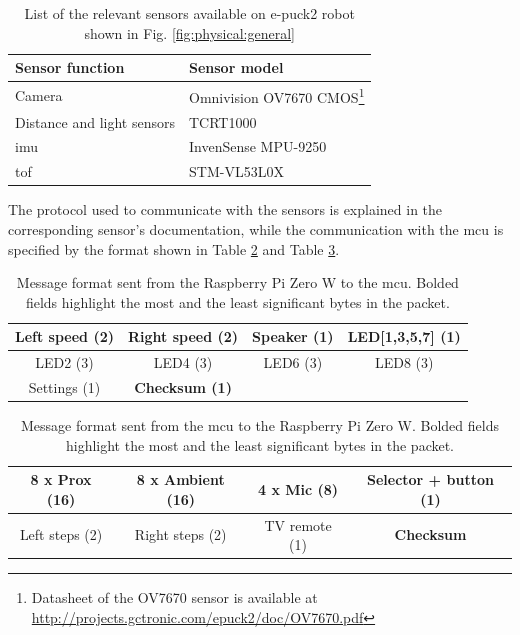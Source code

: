 \begin{table}[H]
    \centering
    \begin{tabular}{|l|l|}
        \hline
        \textbf{Sensor function} & \textbf{Sensor model} \\
        \hline
        Camera & Omnivision OV7670 CMOS\footnote{Datasheet of the OV7670 sensor is available at \url{http://projects.gctronic.com/epuck2/doc/OV7670.pdf}} \\
        \hline
        Distance and light sensors & TCRT1000 \\
        \hline
        \ac{imu} & InvenSense MPU-9250 \\
        \hline
        \ac{tof} & STM-VL53L0X \cite{lakovic_application_2019} \\
        \hline
    \end{tabular}
    \caption{List of the relevant sensors available on e-puck2 robot shown in Fig. \ref{fig:physical:general}}
    \label{tab:physical:sensors}
\end{table}

The protocol used to communicate with the sensors is explained in the corresponding sensor's documentation, while the communication with the \ac{mcu} is specified by the format shown in Table \ref{tab:physical:rpi_to_mcu} and Table \ref{tab:physical:mcu_to_rpi}.

\begin{table}[H]
    \centering
    \begin{tabular}{c|c|c|c}
    \hline
    \textbf{Left speed (2)} & Right speed (2) & Speaker (1) & LED[1,3,5,7] (1)  \\
    \hline
    LED2 (3) & LED4 (3) & LED6 (3) & LED8 (3) \\
    \hline
    Settings (1) & \textbf{Checksum (1)} & & \\
    \hline
    \end{tabular}
    \caption[Message format sent from the Raspberry Pi Zero W to the \ac{mcu}]{Message format sent from the Raspberry Pi Zero W to the \ac{mcu}. Bolded fields highlight the most and the least significant bytes in the packet.}
    \label{tab:physical:rpi_to_mcu}
\end{table}

\begin{table}[H]
    \centering
    \begin{tabular}{c|c|c|c}
    \hline
    \textbf{8 x Prox (16)} & 8 x Ambient (16) & 4 x Mic (8) & Selector + button (1) \\
    \hline
    Left steps (2) & Right steps (2) & TV remote (1) & \textbf{Checksum} \\
    \hline
    \end{tabular}
    \caption[Message format sent from the \ac{mcu} to the Raspberry Pi Zero W]{Message format sent from the \ac{mcu} to the Raspberry Pi Zero W. Bolded fields highlight the most and the least significant bytes in the packet.}
    \label{tab:physical:mcu_to_rpi}
\end{table}

